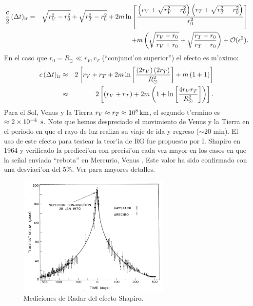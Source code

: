 \begin{eqnarray}
\frac{c}{2}\,(\Delta t)_{\rm ir}&=&\sqrt{r_V^2-r_0^2}+\sqrt{r_T^2-r_0^2}+2m\ln\left[\frac{\left(r_V+\sqrt{r_V^2-r_0^2}\right)\left(r_T+\sqrt{r_T^2-r_0^2}\right)}{r_0^2}\right] \nonumber\\
&&+m\left(\sqrt{\frac{r_V-r_0}{r_V+r_0}}+\sqrt{\frac{r_T-r_0}{r_T+r_0}}\right)+\mathcal{O}(\epsilon^2).
\end{eqnarray}
En el caso que $r_0=R_\odot\ll r_V, r_T$ (``conjunci'on superior'') el efecto es m'aximo:
\begin{eqnarray}
c\,(\Delta t)_{\rm ir}&\approx& 2\left[r_V+r_T+2m\ln\left[\frac{\left(2r_V\right)\left(2r_T\right)}{R_\odot^2}\right]+m\left(1+1\right) \right]\\
&\approx&2\left[(r_V+r_T)+2m\left(1+\ln\left[\frac{4r_Vr_T}{R_\odot^2}\right]\right)\right].
\end{eqnarray}
Para el Sol, Venus y la Tierra $r_V\approx r_T\approx 10^8\text{\,km}$, el segundo t'ermino es $\approx 2\times 10^{-4}\text{\, s}$. Note que hemos despreciado el movimiento de Venus y la Tierra en el periodo en que el rayo de luz realiza su viaje de ida y regreso ($\sim 20\text{ min}$). El uso de este efecto para testear la teor'ia de RG fue propuesto por I. Shapiro en 1964 \cite{Shapiro64} y verificado la predicci'on con precisi'on cada vez mayor en los casos en que la se\~nal enviada ``rebota'' en Mercurio, Venus \cite{Shapiro71}. Este valor ha sido confirmado con una desviaci'on del 5\%. Ver \cite{Wei72} para mayores detalles.
\begin{figure}[H]
\begin{center}
\includegraphics[height=6cm]{fig/fig-shapiro-delay-2.pdf}
\caption{Mediciones de Radar del efecto Shapiro.}
\end{center}
\end{figure}
